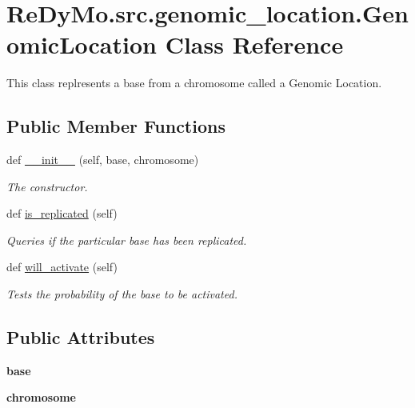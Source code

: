 \hypertarget{classReDyMo_1_1src_1_1genomic__location_1_1GenomicLocation}{}\section{Re\+Dy\+Mo.\+src.\+genomic\+\_\+location.\+Genomic\+Location Class Reference}
\label{classReDyMo_1_1src_1_1genomic__location_1_1GenomicLocation}


This class replresents a base from a chromosome called a Genomic Location.  


\subsection*{Public Member Functions}
\begin{DoxyCompactItemize}
\item 
def \mbox{\hyperlink{classReDyMo_1_1src_1_1genomic__location_1_1GenomicLocation_ad2fc819130c39efcd02df0b35e6305b3}{\+\_\+\+\_\+init\+\_\+\+\_\+}} (self, base, chromosome)
\begin{DoxyCompactList}\small\item\em The constructor. \end{DoxyCompactList}\item 
def \mbox{\hyperlink{classReDyMo_1_1src_1_1genomic__location_1_1GenomicLocation_a4f524b6f975b0b22af1b82aad57af0b3}{is\+\_\+replicated}} (self)
\begin{DoxyCompactList}\small\item\em Queries if the particular base has been replicated. \end{DoxyCompactList}\item 
def \mbox{\hyperlink{classReDyMo_1_1src_1_1genomic__location_1_1GenomicLocation_a2cabef230d8c2b1278a92e0e4ff24267}{will\+\_\+activate}} (self)
\begin{DoxyCompactList}\small\item\em Tests the probability of the base to be activated. \end{DoxyCompactList}\end{DoxyCompactItemize}
\subsection*{Public Attributes}
\begin{DoxyCompactItemize}
\item 
\mbox{\label{classReDyMo_1_1src_1_1genomic__location_1_1GenomicLocation_a96ddb3ccb009bf1267042a2a05da16b6}} 
{\bfseries base}
\item 
\mbox{\label{classReDyMo_1_1src_1_1genomic__location_1_1GenomicLocation_abb84c133360e933e46305c2c48aac776}} 
{\bfseries chromosome}
\end{DoxyCompactItemize}



